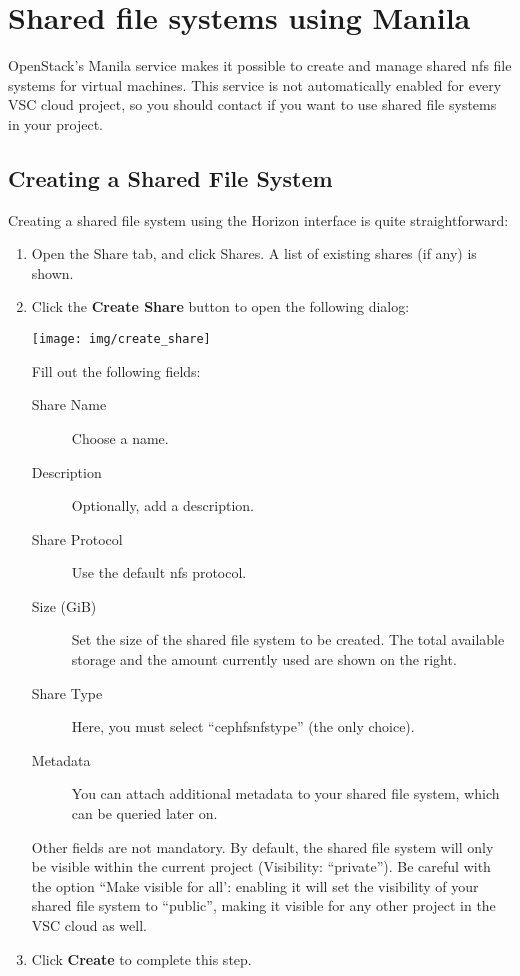 \chapter{Shared file systems using Manila}\label{cha:shared-file-systems}
OpenStack's Manila service makes it possible to create and manage
shared \gls{nfs} file systems for virtual machines.  This service is
not automatically enabled for every VSC cloud project, so you should
contact \cloudinfo if you want to use shared file systems in your
project.

\section*{Creating a Shared File System}\label{sec:creating-shared-file}
Creating a shared file system using the Horizon interface is quite straightforward:
\begin{enumerate}
\item Open the Share tab, and click Shares.  A list of existing shares (if any) is shown.
\item Click the \textbf{Create Share} button to open the following dialog:
  \begin{center}
    \texttt{[image: img/create\_share]}
  \end{center}
  Fill out the following fields:
  \begin{description}
  \item[Share Name] Choose a name.
  \item[Description] Optionally, add a description.
  \item[Share Protocol] Use the default \gls{nfs} protocol.
  \item[Size (GiB)] Set the size of the shared file system to be
    created.  The total available storage and the amount currently
    used are shown on the right.
  \item[Share Type] Here, you must select ``cephfsnfstype'' (the only choice).
  \item[Metadata] You can attach additional metadata to your shared
    file system, which can be queried later on.
  \end{description}
  Other fields are not mandatory.  By default, the shared file system
  will only be visible within the current project (Visibility:
  ``private'').  Be careful with the option ``Make visible for all':
  enabling it will set the visibility of your shared file system to
  ``public'', making it visible for any other project in the VSC cloud
  as well.
\item Click \textbf{Create} to complete this step.
\end{enumerate}

